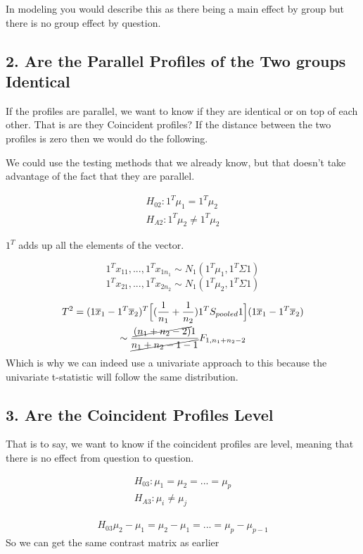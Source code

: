 In modeling you would describe this as there being a main effect by group but there is no group effect by question.

\subsection*{2. Are the Parallel Profiles of the Two groups Identical}
If the profiles are parallel, we want to know if they are identical or on top of each other. That is are they Coincident profiles? 
If the distance between the two profiles is zero then we would do the following.

We could use the testing methods that we already know, but that doesn't take advantage of the fact that they are parallel.

\begin{gather*}
    H_{02}: 1^T\mu_1 = 1^T\mu_2 \\
    H_{A2}: 1^T\mu_2 \neq 1^T\mu_2
\end{gather*}

$1^T$ adds up all the elements of the vector.

\[1^Tx_{11},...,1^Tx_{1n_1}\sim N_1(1^T\mu_1,1^T\Sigma 1)\]
\[1^Tx_{21},...,1^Tx_{2n_2}\sim N_1(1^T\mu_2,1^T\Sigma 1)\]

\begin{gather*}
    T^2 = (1\overline{x}_1 - 1^T\overline{x}_2)^T \Big [ 
(\frac{1}{n_1} + \frac{1}{n_2})1^T S_{pooled}1
\Big]
(1\overline{x}_1 - 1^T\overline{x}_2)\\
\sim
\frac{\cancel{(n_1+n_2-2)}1}{\cancel{n_1+n_2-1-1}}F_{1,n_1+n_2-2}
\end{gather*}
Which is why we can indeed use a univariate approach to this because the univariate t-statistic will follow the same distribution.
\subsection{3. Are the Coincident Profiles Level}

That is to say, we want to know if the coincident profiles are level, meaning that there is no effect from question to question.

\begin{gather*}
    H_{03}: \mu_1 = \mu_2 =...=\mu_p \\
    H_{A3}: \mu_i \neq \mu_j
\end{gather*}

\begin{gather*}
    H_{03}\mu_2-\mu_1 = \mu_2-\mu_1 = ... =\mu_p-\mu_{p-1}
\end{gather*}
So we can get the same contrast matrix as earlier

